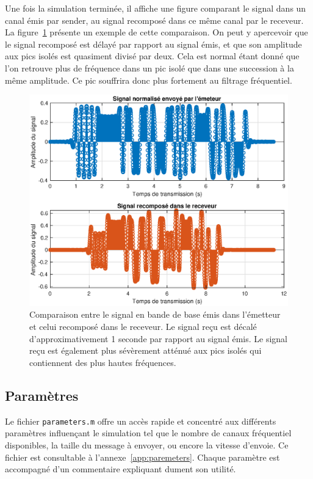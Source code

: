 \documentclass[10pt, oneside, a4paper]{article}
\begin{document}
Une fois la simulation terminée, il affiche une figure comparant le signal dans un canal émis par sender, au signal recomposé dans ce même canal par le receveur.
La figure~\ref{fig:comparaison} présente un exemple de cette comparaison.
On peut y apercevoir que le signal recomposé est délayé par rapport au signal émis, et que son amplitude aux pics isolés est quasiment divisé par deux.
Cela est normal étant donné que l'on retrouve plus de fréquence dans un pic isolé que dans une succession à la même amplitude.
Ce pic souffrira donc plus fortement au filtrage fréquentiel.

\begin{figure}[htbp]
	\centering
	\includegraphics[height=0.45\textheight]{eps/comparaison.eps}
	\caption{Comparaison entre le signal en bande de base émis dans l'émetteur et celui
			 recomposé dans le receveur.
			 Le signal reçu est décalé d'approximativement 1 seconde par rapport au signal
			 émis.
			 Le signal reçu est également plus sévèrement atténué aux pics isolés qui
			 contiennent des plus hautes fréquences.}
	\label{fig:comparaison}
\end{figure}

\subsection{Paramètres}
Le fichier \texttt{parameters.m} offre un accès rapide et concentré aux différents paramètres influençant le simulation tel que le nombre de canaux fréquentiel disponibles, la taille du message à envoyer, ou encore la vitesse d'envoie.
Ce fichier est consultable à l'annexe~\ref{app:paremeters}.
Chaque paramètre est accompagné d'un commentaire expliquant dument son utilité.
\end{document}
